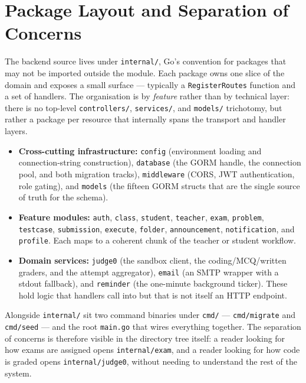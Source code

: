 \section{Package Layout and Separation of Concerns}\label{sec:packages}

The backend source lives under \texttt{internal/}, Go's convention for packages
that may not be imported outside the module. Each package owns one slice of the
domain and exposes a small surface --- typically a \texttt{RegisterRoutes}
function and a set of handlers. The organisation is by \emph{feature} rather
than by technical layer: there is no top-level \texttt{controllers/},
\texttt{services/}, and \texttt{models/} trichotomy, but rather a package per
resource that internally spans the transport and handler layers.

\begin{itemize}
  \item \textbf{Cross-cutting infrastructure:} \texttt{config} (environment
        loading and connection-string construction), \texttt{database} (the
        GORM handle, the connection pool, and both migration tracks),
        \texttt{middleware} (CORS, JWT authentication, role gating), and
        \texttt{models} (the fifteen GORM structs that are the single source of
        truth for the schema).
  \item \textbf{Feature modules:} \texttt{auth}, \texttt{class},
        \texttt{student}, \texttt{teacher}, \texttt{exam}, \texttt{problem},
        \texttt{testcase}, \texttt{submission}, \texttt{execute},
        \texttt{folder}, \texttt{announcement}, \texttt{notification}, and
        \texttt{profile}. Each maps to a coherent chunk of the teacher or
        student workflow.
  \item \textbf{Domain services:} \texttt{judge0} (the sandbox client, the
        coding/MCQ/written graders, and the attempt aggregator),
        \texttt{email} (an SMTP wrapper with a stdout fallback), and
        \texttt{reminder} (the one-minute background ticker). These hold logic
        that handlers call into but that is not itself an HTTP endpoint.
\end{itemize}

Alongside \texttt{internal/} sit two command binaries under \texttt{cmd/} ---
\texttt{cmd/migrate} and \texttt{cmd/seed} --- and the root \texttt{main.go} that
wires everything together. The separation of concerns is therefore visible in
the directory tree itself: a reader looking for how exams are assigned opens
\texttt{internal/exam}, and a reader looking for how code is graded opens
\texttt{internal/judge0}, without needing to understand the rest of the system.

